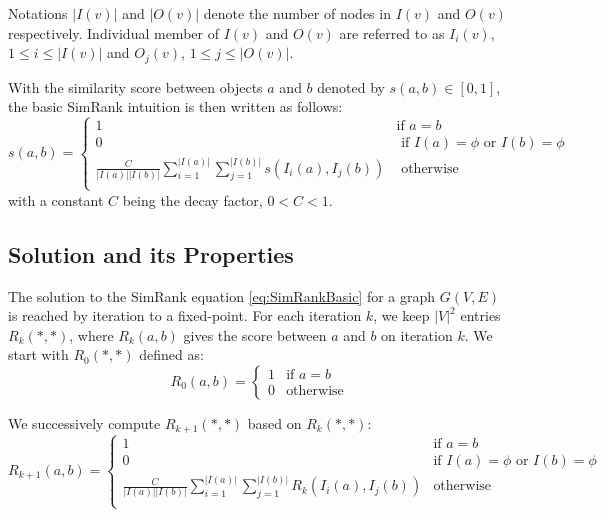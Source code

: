 Notations $|I(v)|$ and $|O(v)|$ denote the number of nodes in $I(v)$ and $O(v)$ respectively. 
Individual member of $I(v)$ and $O(v)$ are referred to as $I_i(v)$, $1\leq i \leq |I(v)|$ and $O_j(v)$, $1\leq j \leq |O(v)|$.

With the similarity score between objects $a$ and $b$ denoted by $s(a,b)\in [0,1]$, the basic SimRank intuition is then written as follows: 
\begin{equation} \label{eq:SimRankBasic}
s(a,b) =
\left\{ \begin{array}{rl}
1 & \mbox{if } a=b \\
0 &  \mbox{ if } I(a)=\phi \mbox{ or } I(b)=\phi \\
\frac{C}{|I(a)||I(b)|}\sum_{i=1}^{|I(a)|}\sum_{j=1}^{|I(b)|} s(I_i(a),I_j(b)) & \mbox{ otherwise } \\
\end{array}\right.
\end{equation}
with a constant $C$ being the decay factor, $0 < C < 1$.

\subsection{Solution and its Properties}
The solution to the SimRank equation \ref{eq:SimRankBasic} for a graph $G(V,E)$ is reached by iteration to a fixed-point. 
For each iteration $k$, we keep ${|V|}^2$ entries $R_k(\ast,\ast)$, where $R_k(a,b)$ gives the score between $a$ and $b$ on iteration $k$.
We start with $R_0(\ast,\ast)$ defined as:
\begin{equation}
R_0(a,b) =
\left\{ \begin{array}{rl}
1 & \mbox{if } a=b \\
0 & \mbox{otherwise}
\end{array}\right.
\end{equation}

We successively compute $R_{k+1}(\ast,\ast)$ based on $R_k(\ast,\ast)$:
\begin{equation} \label{eq:SimRankBasicRecursive}
R_{k+1}(a,b) =
\left\{ \begin{array}{rl}
1 & \mbox{if } a=b \\
0 &  \mbox{if } I(a)=\phi \mbox{ or } I(b)=\phi \\
\frac{C}{|I(a)||I(b)|}\sum_{i=1}^{|I(a)|}\sum_{j=1}^{|I(b)|} R_k(I_i(a),I_j(b)) & \mbox{otherwise } \\
\end{array}\right.
\end{equation}

